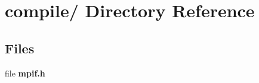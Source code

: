 \section{compile/ Directory Reference}
\label{dir_0a53f755e3dae57b7a0472f9946894b7}
\subsection*{Files}
\begin{CompactItemize}
\item 
file {\bf mpif.h}
\end{CompactItemize}

